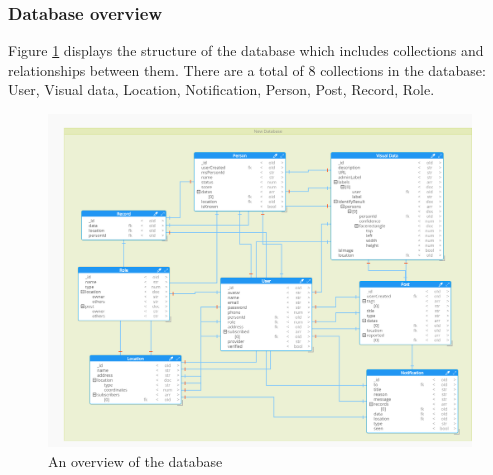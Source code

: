 \subsubsection{Database overview}
Figure \ref{chap4:database_overview} displays the structure of the database which includes collections and relationships between them.
There are a total of 8 collections in the database: User, Visual data, Location, Notification, Person, Post, Record, Role. 
\begin{center}
    \begin{figure}[H]
    \centering
    \includegraphics[width=1\columnwidth]{images/chap4/Model.png}
    \caption{An overview of the database}
    \label{chap4:database_overview}
    \end{figure}
\end{center}
\cleardoublepage
